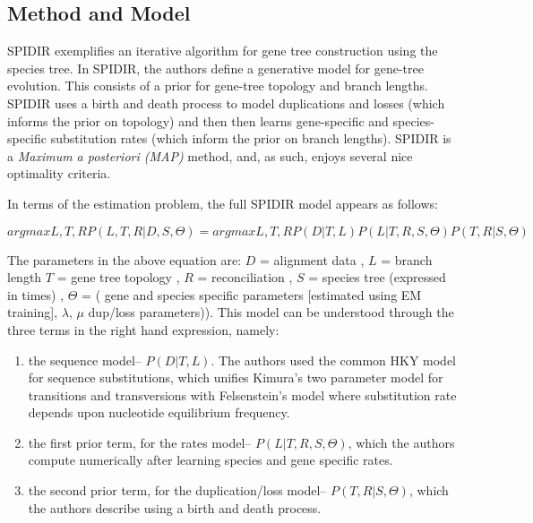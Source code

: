 \subsection{Method and Model} 
SPIDIR exemplifies an iterative algorithm for gene tree construction
using the species tree. In SPIDIR, the authors define a generative
model for gene-tree evolution. This consists of a prior for gene-tree
topology and branch lengths. SPIDIR uses a birth and death process to
model duplications and losses (which informs the prior on topology)
and then then learns gene-specific and species-specific substitution
rates (which inform the prior on branch lengths). SPIDIR is a
\textit{Maximum a posteriori (MAP)} method, and, as such, enjoys
several nice optimality criteria.

In terms of the estimation problem, the full SPIDIR model appears as
follows:

$argmax L,T,R P(L,T,R|D,S,\Theta) = argmax L,T,R P(D|T,L)P(L|T,R,S,\Theta)P(T,R|S,\Theta)$ 

The parameters in the above equation are: $D$ = alignment data , $L$ =
branch length $T$ = gene tree topology , $R$ = reconciliation , $S$ =
species tree (expressed in times) , $\Theta$ = ( gene and species
specific parameters [estimated using EM training], $\lambda$, $\mu$
dup/loss parameters)). This model can be understood through the three
terms in the right hand expression, namely:

\begin{enumerate} 
\item the sequence model-- $P(D|T,L)$. The authors used the common HKY
  model for sequence substitutions, which unifies Kimura's two
  parameter model for transitions and transversions with Felsenstein's
  model where substitution rate depends upon nucleotide equilibrium
  frequency.
\item the first prior term, for the rates model-- $P(L|T,R,S,\Theta)$,
  which the authors compute numerically after learning species and
  gene specific rates.
\item the second prior term, for the duplication/loss model--
  $P(T,R|S,\Theta)$, which the authors describe using a birth and
  death process.
\end{enumerate} 

